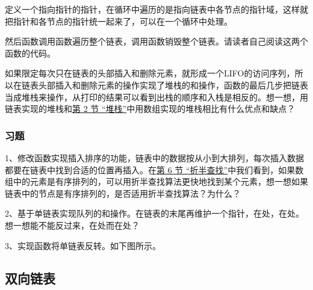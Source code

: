 

定义一个指向指针的指针，在循环中遍历的是指向链表中各节点的指针域，这样就把指针和各节点的指针统一起来了，可以在一个循环中处理。



然后函数调用函数遍历整个链表，调用函数销毁整个链表。请读者自己阅读这两个函数的代码。



如果限定每次只在链表的头部插入和删除元素，就形成一个LIFO的访问序列，所以在链表头部插入和删除元素的操作实现了堆栈的和操作，函数的最后几步把链表当成堆栈来操作，从打印的结果可以看到出栈的顺序和入栈是相反的。想一想，用链表实现的堆栈和\hyperlink{db.ch12s02.id2749855}{第 2 节 “堆栈”}中用数组实现的堆栈相比有什么优点和缺点？


\subsubsection*{习题}
%


1、修改函数实现插入排序的功能，链表中的数据按从小到大排列，每次插入数据都要在链表中找到合适的位置再插入。在\hyperlink{db.ch11s06.id2746698}{第 6 节 “折半查找”}中我们看到，如果数组中的元素是有序排列的，可以用折半查找算法更快地找到某个元素，想一想如果链表中的节点是有序排列的，是否适用折半查找算法？为什么？



2、基于单链表实现队列的和操作。在链表的末尾再维护一个指针，在处，在处。想一想能不能反过来，在处而在处？



3、实现函数将单链表反转。如下图所示。



\subsection{双向链表}
%


